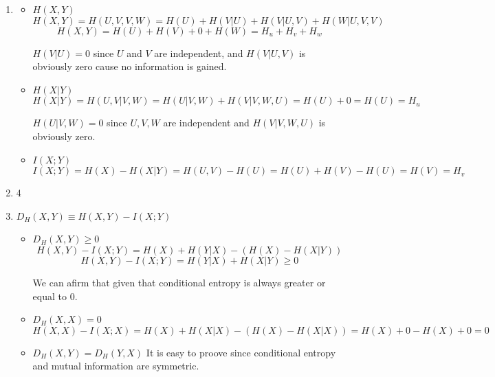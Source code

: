 \documentclass{article}
\begin{document}
\begin{enumerate}
	\item
	      \begin{itemize}
		      \item \(H(X, Y)\)
		            \[H(X, Y) = H(U, V, V, W) = H(U) + H(V | U) + H(V | U, V) + H(W | U, V, V)\]
		            \[H(X, Y) = H(U) + H(V) + 0 + H(W) = H_u + H_v + H_w\]

		            \(H(V | U) = 0\) since \(U\) and \(V\) are independent, and \(H(V | U, V)\) is obviously zero cause no information is gained.

		      \item \(H(X | Y)\)
		            \[H(X | Y) = H(U,V | V, W) = H(U | V, W) + H(V | V, W, U) = H(U) + 0 = H(U) = H_u\]

		            \(H(U | V, W) = 0\) since \(U, V, W\) are independent and \(H(V | V, W, U)\) is obviously zero.

		      \item \(I(X;Y)\)
		            \[I(X;Y) = H(X) - H(X|Y) = H(U, V) - H(U) = H(U) + H(V) - H(U) = H(V) = H_v\]
	      \end{itemize}

	\item 4
	\item \(D_H(X, Y) \equiv H(X, Y) - I(X; Y)\)
	      \begin{itemize}
		      \item \(D_H(X, Y) \geq 0\)
		            \[H(X, Y) - I(X; Y) = H(X) + H(Y|X) - (H(X) - H(X|Y))\]
		            \[H(X, Y) - I(X; Y) = H(Y|X) + H(X|Y) \geq 0\]

		            We can afirm that given that conditional entropy is always greater or equal to 0.

		      \item \(D_H(X, X) = 0\)
		            \[H(X, X) - I(X;X) = H(X) + H(X|X) - (H(X) - H(X|X)) = H(X) + 0 - H(X) + 0 = 0\]
		      \item \(D_H(X, Y) = D_H(Y, X)\)
		            It is easy to proove since conditional entropy and mutual information are symmetric.


\end{itemize}
\end{enumerate}
\end{document}
